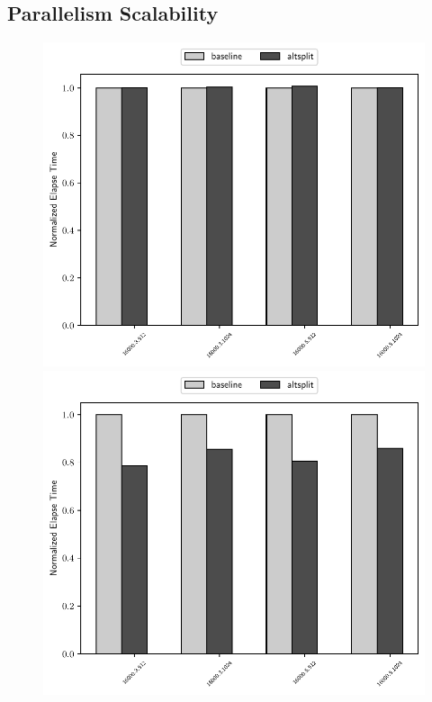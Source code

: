 \subsection{Parallelism Scalability}
\begin{figure}[H]
    \centerline{
        \includegraphics[scale=0.55]{altsplit/figs/mn4/16000_avgs_80.pdf}
        \includegraphics[scale=0.55]{altsplit/figs/mn4/16000_avgs_160.pdf}
    }
    \centerline{
}
\end{figure}
